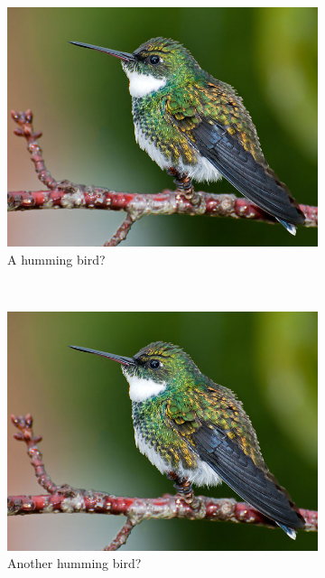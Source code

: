 \documentclass{article}
\begin{document}
\begin{figure}[h]
  \centering
  \begin{subfigure}[b]{0.5\linewidth}
    \includegraphics[width=\linewidth]{bird.jpg}
    \caption{A humming bird?}
  \end{subfigure}
  \\
  \begin{subfigure}[b]{0.3\linewidth}
    \includegraphics[width=\linewidth]{bird.jpg}
    \caption{Another humming bird?}
  \end{subfigure}
  \begin{subfigure}[b]{0.3\linewidth}

\end{subfigure}
\end{figure}
\end{document}
